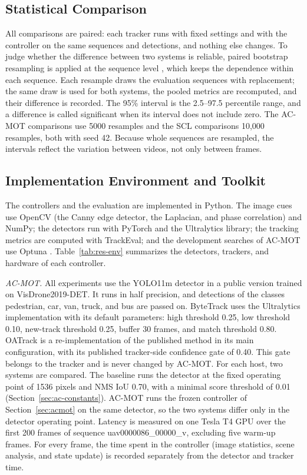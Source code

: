\subsection{Statistical Comparison}\label{sec:res-bootstrap}
All comparisons are paired: each tracker runs with fixed settings and with the controller on the same sequences and detections, and nothing else changes. To judge whether the difference between two systems is reliable, paired bootstrap resampling is applied at the sequence level \cite{efron1993bootstrap}, which keeps the dependence within each sequence. Each resample draws the evaluation sequences with replacement; the same draw is used for both systems, the pooled metrics are recomputed, and their difference is recorded. The 95\% interval is the 2.5--97.5 percentile range, and a difference is called significant when its interval does not include zero. The AC-MOT comparisons use 5000 resamples and the SCL comparisons 10,000 resamples, both with seed 42. Because whole sequences are resampled, the intervals reflect the variation between videos, not only between frames.

\subsection{Implementation Environment and Toolkit}\label{sec:res-env}
The controllers and the evaluation are implemented in Python. The image cues use OpenCV (the Canny edge detector, the Laplacian, and phase correlation) and NumPy; the detectors run with PyTorch and the Ultralytics library; the tracking metrics are computed with TrackEval; and the development searches of AC-MOT use Optuna \cite{akiba2019optuna}. Table~\ref{tab:res-env} summarizes the detectors, trackers, and hardware of each controller.

\emph{AC-MOT.} All experiments use the YOLO11m detector \cite{jocher2024yolo11} in a public version trained on VisDrone2019-DET. It runs in half precision, and detections of the classes pedestrian, car, van, truck, and bus are passed on. ByteTrack uses the Ultralytics implementation with its default parameters: high threshold 0.25, low threshold 0.10, new-track threshold 0.25, buffer 30 frames, and match threshold 0.80. OATrack is a re-implementation of the published method \cite{qi2026oatrack} in its main configuration, with its published tracker-side confidence gate of 0.40. This gate belongs to the tracker and is never changed by AC-MOT. For each host, two systems are compared. The baseline runs the detector at the fixed operating point of 1536 pixels and NMS IoU 0.70, with a minimal score threshold of 0.01 (Section~\ref{sec:ac-constants}). AC-MOT runs the frozen controller of Section~\ref{sec:acmot} on the same detector, so the two systems differ only in the detector operating point. Latency is measured on one Tesla T4 GPU over the first 200 frames of sequence uav0000086\_00000\_v, excluding five warm-up frames. For every frame, the time spent in the controller (image statistics, scene analysis, and state update) is recorded separately from the detector and tracker time.

